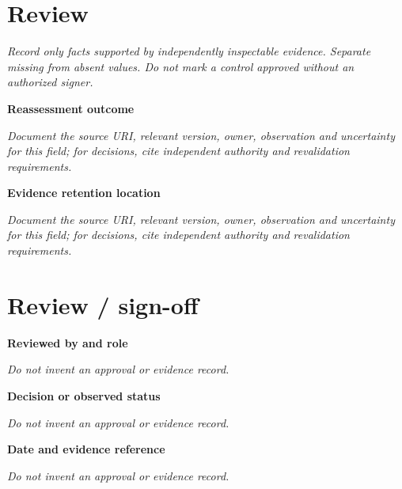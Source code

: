 \documentclass[11pt,letterpaper]{article}
\begin{document}
\section{Review}
\noindent\emph{Record only facts supported by independently inspectable evidence. Separate missing from absent values. Do not mark a control approved without an authorized signer.}\par
\noindent\textbf{Reassessment outcome}\par
\noindent\emph{Document the source URI, relevant version, owner, observation and uncertainty for this field; for decisions, cite independent authority and revalidation requirements.}\par\medskip
\noindent\textbf{Evidence retention location}\par
\noindent\emph{Document the source URI, relevant version, owner, observation and uncertainty for this field; for decisions, cite independent authority and revalidation requirements.}\par\medskip
\section{Review / sign-off}
\noindent\textbf{Reviewed by and role}\par
\emph{Do not invent an approval or evidence record.}\par\medskip
\noindent\textbf{Decision or observed status}\par
\emph{Do not invent an approval or evidence record.}\par\medskip
\noindent\textbf{Date and evidence reference}\par
\emph{Do not invent an approval or evidence record.}\par\medskip
\end{document}
